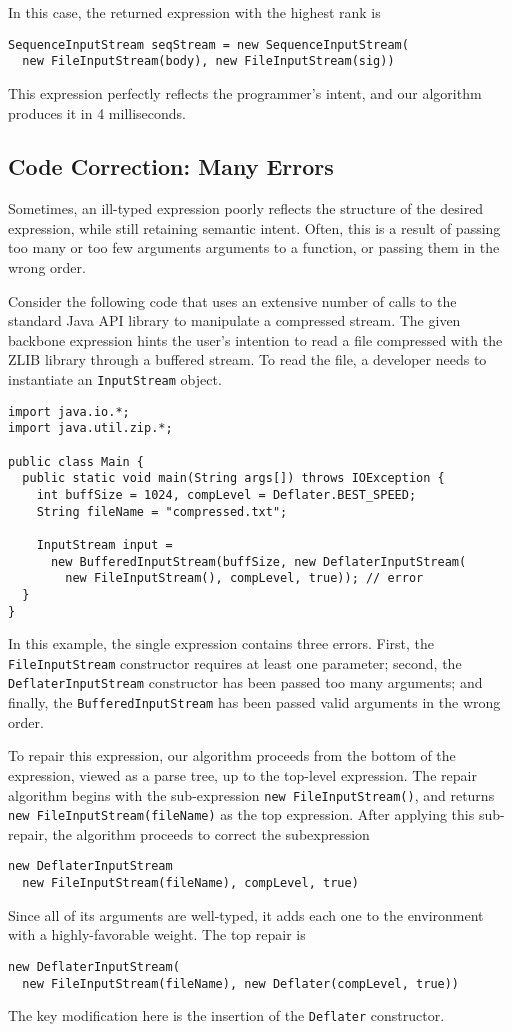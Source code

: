 In this case, the returned expression with the highest rank is
\begin{lstlisting}
SequenceInputStream seqStream = new SequenceInputStream(
  new FileInputStream(body), new FileInputStream(sig))
\end{lstlisting}
This expression perfectly reflects the programmer's intent, and our algorithm produces it in 4 milliseconds.

\subsection{Code Correction: Many Errors}
Sometimes, an ill-typed expression poorly reflects the structure of the desired expression, while still retaining semantic intent. Often, this is a result of passing too many or too few arguments arguments to a function, or passing them in the wrong order.

Consider the following code that uses an extensive number of calls to the standard Java API library to manipulate a compressed stream. The given backbone expression hints the user's intention to read a file compressed with the ZLIB library through a buffered stream. To read the file, a developer needs to instantiate an \lstinline{InputStream} object.
\begin{lstlisting}
import java.io.*;
import java.util.zip.*;

public class Main {
  public static void main(String args[]) throws IOException {
    int buffSize = 1024, compLevel = Deflater.BEST_SPEED;
    String fileName = "compressed.txt";
    
    InputStream input = 
      new BufferedInputStream(buffSize, new DeflaterInputStream(
        new FileInputStream(), compLevel, true)); // error 
  }
}
\end{lstlisting}
In this example, the single expression contains three errors. First, the \lstinline{FileInputStream} constructor requires at least one parameter; second, the \lstinline{DeflaterInputStream} constructor has been passed too many arguments; and finally, the \lstinline{BufferedInputStream} has been passed valid arguments in the wrong order.

To repair this expression, our algorithm proceeds from the bottom of the expression, viewed as a parse tree, up to the top-level expression. The repair algorithm begins with the sub-expression \lstinline{new FileInputStream()}, and returns \lstinline{new FileInputStream(fileName)} as the top expression. After applying this sub-repair, the algorithm proceeds to correct the subexpression
\begin{lstlisting}
new DeflaterInputStream
  new FileInputStream(fileName), compLevel, true)
\end{lstlisting}
Since all of its arguments are well-typed, it adds each one to the environment with a highly-favorable weight. The top repair is
\begin{lstlisting}
new DeflaterInputStream(
  new FileInputStream(fileName), new Deflater(compLevel, true))
\end{lstlisting}
The key modification here is the insertion of the \lstinline{Deflater} constructor.

